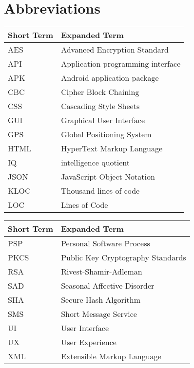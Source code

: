 \chapter{Abbreviations}

\begin{tabular}{p{40mm}|p{100mm}}
	\textbf{Short Term}&\textbf{Expanded Term}\\
	\hline
	
	AES		& Advanced Encryption Standard\\	
	API		& Application programming interface\\
	APK		& Android application package\\
	
	CBC 		& Cipher Block Chaining\\	
	CSS 		& Cascading Style Sheets\\
	
	GUI		& Graphical User Interface\\
	GPS		& Global Positioning System\\
	
	HTML 	& HyperText Markup Language\\
	
	IQ			& intelligence quotient\\
	
	JSON 	& JavaScript Object Notation\\
	
	KLOC	&	Thousand lines of code\\
	
	LOC		&	Lines of Code\\

\end{tabular}

\begin{tabular}{p{40mm}|p{100mm}}
	\textbf{Short Term}&\textbf{Expanded Term}\\
	\hline

	PSP		& 	Personal Software Process\\	
	
	PKCS 	& Public Key Cryptography Standards\\
	RSA		& Rivest-Shamir-Adleman\\
	
	SAD 		& Seasonal Affective Disorder\\
	SHA 		& Secure Hash Algorithm\\
	SMS 		& Short Message Service\\
	
	UI			& User Interface\\
	UX 		& User Experience\\	
	
	XML		& Extensible Markup Language\\

\end{tabular}